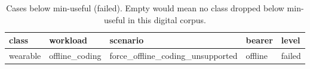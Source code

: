 \begin{table}[h]
\centering
\caption{Cases below min-useful (failed). Empty would mean no class dropped below min-useful in this digital corpus.}
\begin{tabular}{lllll}\toprule
class & workload & scenario & bearer & level \\\midrule
wearable & offline\_coding & force\_offline\_coding\_unsupported & offline & failed \\
\bottomrule\end{tabular}
\end{table}
